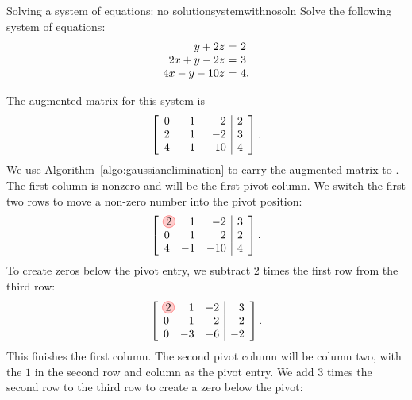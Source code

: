 \begin{example}{Solving a system of equations: no solution}{systemwithnosoln}
  Solve the following system of equations:
  \begin{equation*}
    \begin{array}{r@{~}c@{~}l}
           y  +2z &=& 2\\
      2x  +y  -2z &=& 3\\
      4x  -y -10z &=& 4.
    \end{array}
  \end{equation*}
\end{example}

\begin{solution} The augmented matrix for this system is
  \begin{equation*}
    \left[
    \begin{array}{rrr|r}
      0 &  1 &   2 & 2\\
      2 &  1 &  -2 & 3\\
      4 & -1 & -10 & 4      
    \end{array}
    \right].
  \end{equation*}
  We use Algorithm~\ref{algo:gaussianelimination} to carry the
  augmented matrix to {\ef}. The first column is nonzero and will be the
  first pivot column. We switch the first two rows to move a non-zero
  number into the pivot position:
  \begin{equation*}
    \leftB
    \begin{array}{rrr|r}
      \circled{2} &  1 &  -2 & 3\\
      0 &  1 &   2 & 2\\
      4 & -1 & -10 & 4      
    \end{array}
    \rightB.
  \end{equation*}
  To create zeros below the pivot entry, we subtract $2$ times the
  first row from the third row:
  \begin{equation*}
    \leftB
    \begin{array}{rrr|r}
      \circled{2} &  1 &  -2 & 3\\
      0 &  1 &   2 & 2\\
      0 & -3 & -6 & -2      
    \end{array}
    \rightB.
  \end{equation*}
  This finishes the first column. The second pivot column will be
  column two, with the $1$ in the second row and column as the pivot
  entry. We add $3$ times the second row to the third row to create a
  zero below the pivot:

\end{solution}
